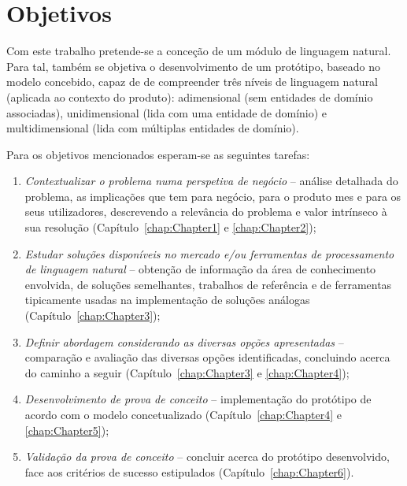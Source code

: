 \section{Objetivos}
\label{sec:chap01_objectives}
Com este trabalho pretende-se a conceção de um módulo de linguagem natural. Para tal, também se objetiva o desenvolvimento de um protótipo, baseado no modelo concebido, capaz de de compreender três níveis de linguagem natural (aplicada ao contexto do produto): adimensional (sem entidades de domínio associadas), unidimensional (lida com uma entidade de domínio) e multidimensional (lida com múltiplas entidades de domínio).

Para os objetivos mencionados esperam-se as seguintes tarefas:
\begin{enumerate}
    \item
    {
        \textit{Contextualizar o problema numa perspetiva de negócio} -- análise detalhada do problema, as implicações que tem para negócio, para o produto \gls{mes} e para os seus utilizadores, descrevendo a relevância do problema e valor intrínseco à sua resolução (Capítulo~\ref{chap:Chapter1} e \ref{chap:Chapter2});
    }
    \item
    {
        \textit{Estudar soluções disponíveis no mercado e/ou ferramentas de processamento de linguagem natural} -- obtenção de informação da área de conhecimento envolvida, de soluções semelhantes, trabalhos de referência e de ferramentas tipicamente usadas na implementação de soluções análogas (Capítulo~\ref{chap:Chapter3});
    }
    \item
    {
        \textit{Definir abordagem considerando as diversas opções apresentadas} -- comparação e avaliação das diversas opções identificadas, concluindo acerca do caminho a seguir (Capítulo~\ref{chap:Chapter3} e \ref{chap:Chapter4});
    }
    \item
    {
        \textit{Desenvolvimento de prova de conceito} -- implementação do protótipo de acordo com o modelo concetualizado (Capítulo~\ref{chap:Chapter4} e \ref{chap:Chapter5});
    }
    \item
    {
        \textit{Validação da prova de conceito} -- concluir acerca do protótipo desenvolvido, face aos critérios de sucesso estipulados (Capítulo~\ref{chap:Chapter6}).
    }
\end{enumerate}

